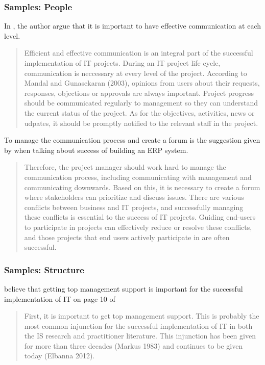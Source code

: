 \subsubsection{Samples: People}
In , the author argue that it is important to have effective communication at each level.

\begin{quotation}
Efficient and effective communication is an integral part of the successful implementation of IT projects. During an IT project life cycle, communication is neccessary at every level of the project. According to Mandal and Gunasekaran (2003), opinions from users about their requests, responses, objections or approvals are always important. Project progress should be communicated regularly to management so they can understand the current status of the project. As for the objectives, activities, news or udpates, it should be promptly notified to the relevant staff in the project.
\end{quotation}


To manage the communication process and create a forum is the suggestion given by \citeauthor{2} when talking about success of building an ERP system.

\begin{quotation}
Therefore, the project manager should work hard to manage the communication process, including communicating with management and communicating downwards. Based on this, it is necessary to create a forum where stakeholders can prioritize and discuss issues. There are various conflicts between business and IT projects, and successfully managing these conflicts is essential to the success of IT projects. Guiding end-users to participate in projects can effectively reduce or resolve these conflicts, and those projects that end users actively participate in are often successful.
\end{quotation}


\subsubsection{Samples: Structure}
\citeauthor{6} believe that getting top management support is important for the successful implementation of IT on page 10 of 
\begin{quotation}
First, it is important to get top management support. This is probably the most common injunction for the successful implementation of IT in both the IS research and practitioner literature. This injunction has been given for more than three decades (Markus 1983) and continues to be given today (Elbanna 2012).
\end{quotation}

